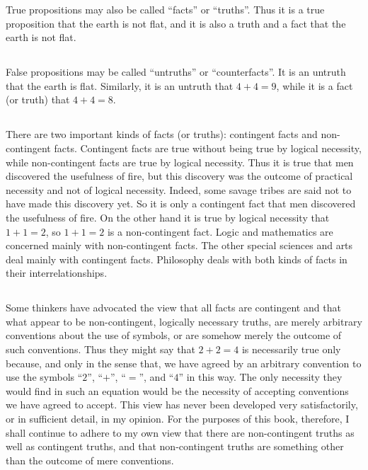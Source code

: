 \documentclass{book}
\begin{document}
True propositions may also be called “facts” or “truths”.  Thus it is a true proposition that the earth is not flat, and it is also a truth and a fact that the earth is not flat.

\subsection{}
\label{sec:2.8}

False propositions may be called “untruths” or “counterfacts”.  It is an untruth that the earth is flat.  Similarly, it is an untruth that \(4 + 4 = 9\), while it is a fact (or truth) that \(4 + 4 = 8\).

\subsection{}
\label{sec:2.9}

There are two important kinds of facts (or truths): contingent facts and non-contingent facts.  Contingent facts are true without being true by logical necessity, while non-contingent facts are true by logical necessity.  Thus it is true that men discovered the usefulness of fire, but this discovery was the outcome of practical necessity and not of logical necessity.  Indeed, some savage tribes are said not to have made this discovery yet.  So it is only a contingent fact that men discovered the usefulness of fire.  On the other hand it is true by logical necessity that \(1 + 1 = 2\), so \(1 + 1 = 2\) is a non-contingent fact.  Logic and mathematics are concerned mainly with non-contingent facts.  The other special sciences and arts deal mainly with contingent facts.  Philosophy deals with both kinds of facts in their interrelationships.

\subsection{}
\label{sec:2.10}

Some thinkers have advocated the view that all facts are contingent and that what appear to be non-contingent, logically necessary truths, are merely arbitrary conventions about the use of symbols, or are somehow merely the outcome of such conventions.  Thus they might say that \(2 + 2 = 4\) is necessarily true only because, and only in the sense that, we have agreed by an arbitrary convention to use the symbols “\(2\)”, “\(+\)”, “\(=\)”, and “\(4\)” in this way.  The only necessity they would find in such an equation would be the necessity of accepting conventions we have agreed to accept.  This view has never been developed very satisfactorily, or in sufficient detail, in my opinion.  For the purposes of this book, therefore, I shall continue to adhere to my own view that there are non-contingent truths as well as contingent truths, and that non-contingent truths are something other than the outcome of mere conventions.
\end{document}
